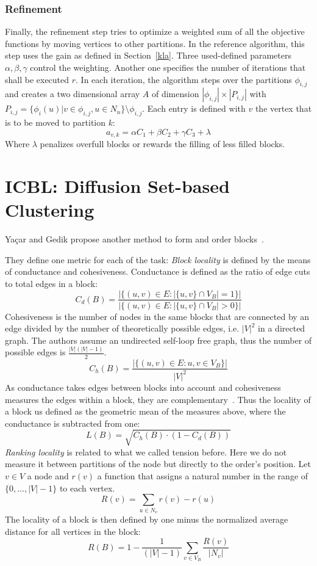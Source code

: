         \subsubsection*{Refinement}
        Finally, the refinement step tries to optimize a weighted sum of all the objective functions by moving vertices to other partitions.
        In the reference algorithm, this step uses the gain as defined in Section~\ref{kla}.
        Three used-defined parameters $\alpha, \beta, \gamma$ control the weighting. Another one specifies the number of iterations that shall be executed $r$.
        In each iteration, the algorithm steps over the partitions $\phi_{i,j}$ and creates a two dimensional array $A$ of dimension $|\phi_{i,j}| \times |P_{i,j}|$ with $P_{i,j} = \{ \phi_i(u) | v \in \phi_{i,j}, u \in N_n\} \setminus \phi_{i,j}$.
        Each entry is defined with $v$ the vertex that is to be moved to partition $k$:
        \[ a_{v,k} = \alpha C_1 + \beta C_2 + \gamma C_3 + \lambda \]
        Where $\lambda$ penalizes overfull blocks or rewards the filling of less filled blocks.


    
\section{ICBL: Diffusion Set-based Clustering}
    Ya\c{c}ar and Gedik propose another method to form and order blocks~\autocite{yacsar2015scalable, yacsar2017distributed}. 
        
    They define one metric for each of the task:
    \textit{Block locality} is defined by the means of conductance and cohesiveness. 
    Conductance is defined as the ratio of edge cuts to total edges in a block:
    \[ C_d (B) = \frac{|\{ (u,v) \in E: |\{u,v\} \cap V_B| = 1\}|}{|\{ (u,v) \in E: |\{u,v\} \cap V_B| > 0\}|} \]
    Cohesiveness is the number of nodes in the same blocks that are connected by an edge divided by the number of theoretically possible edges, i.e. $|V|^2$ in a directed graph. The authors assume an undirected self-loop free graph, thus the number of possible edges is $\frac{|V| (|V| - 1)}{2}$.
    \[ C_h (B) = \frac{|\{ (u,v) \in E: u,v \in V_B \}|}{|V|^2} \]
    As conductance takes edges between blocks into account and cohesiveness measures the edges within a block, they are complementary~\autocite{yacsar2015scalable}.
    Thus the locality of a block us defined as the geometric mean of the measures above, where the conductance is subtracted from one:
    \[ L(B) = \sqrt{C_h (B) \cdot (1 - C_d (B))} \]
    \textit{Ranking locality} is related to what we called tension before. 
    Here we do not measure it between partitions of the node but directly to the order's position. 
    Let $v \in V$ a node and $r(v)$ a function that assigns a natural number in the range of $\{0, \dots, |V|-1\}$ to each vertex.
    \[ R (v) = \sum_{u \in N_v} r(v) - r(u) \]
    The locality of a block is then defined by one minus the normalized average distance for all vertices in the block:
    \[ R(B) = 1 - \frac{1}{(|V| - 1)} \sum_{v \in V_B} \frac{R(v)}{|N_v|} \]
    
